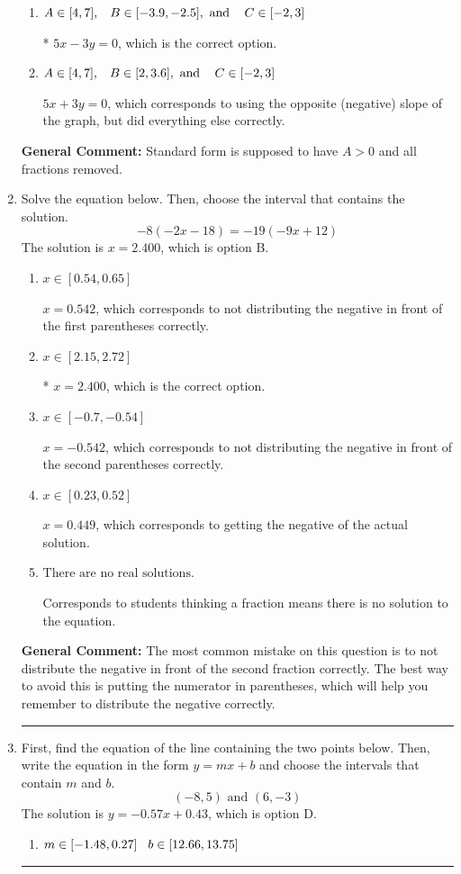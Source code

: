 \documentclass{extbook}[14pt]
\newcommand{\litem}[1]{\item #1

\rule{\textwidth}{0.4pt}}
\begin{document}
\begin{enumerate}
{\begin{enumerate}[label=\Alph*.]
 $-1.667x + 1y = -0.0$, which corresponds to not removing rational values for Standard Form.
\item \( A \in [4, 7], \hspace{3mm} B \in [-3.9, -2.5], \text{ and } \hspace{3mm} C \in [-2, 3] \)

* $5x - 3y = 0$, which is the correct option.
\item \( A \in [4, 7], \hspace{3mm} B \in [2, 3.6], \text{ and } \hspace{3mm} C \in [-2, 3] \)

 $5x + 3y = 0$, which corresponds to using the opposite (negative) slope of the graph, but did everything else correctly.
\end{enumerate}

\textbf{General Comment:} Standard form is supposed to have $A > 0$ and all fractions removed.
}
\litem{
Solve the equation below. Then, choose the interval that contains the solution.
\[ -8(-2x -18) = -19(-9x + 12) \]The solution is \( x = 2.400 \), which is option B.\begin{enumerate}[label=\Alph*.]
\item \( x \in [0.54, 0.65] \)

$x = 0.542$, which corresponds to not distributing the negative in front of the first parentheses correctly.
\item \( x \in [2.15, 2.72] \)

* $x = 2.400$, which is the correct option.
\item \( x \in [-0.7, -0.54] \)

$x = -0.542$, which corresponds to not distributing the negative in front of the second parentheses correctly.
\item \( x \in [0.23, 0.52] \)

$x = 0.449$, which corresponds to getting the negative of the actual solution.
\item \( \text{There are no real solutions.} \)

Corresponds to students thinking a fraction means there is no solution to the equation.
\end{enumerate}

\textbf{General Comment:} The most common mistake on this question is to not distribute the negative in front of the second fraction correctly. The best way to avoid this is putting the numerator in parentheses, which will help you remember to distribute the negative correctly.
}
\litem{
First, find the equation of the line containing the two points below. Then, write the equation in the form $ y=mx+b $ and choose the intervals that contain $m$ and $b$.
\[ (-8, 5) \text{ and } (6, -3) \]The solution is \( y = -0.57x + 0.43 \), which is option D.\begin{enumerate}[label=\Alph*.]
\item \( m \in [-1.48, 0.27] \hspace*{3mm} b \in [12.66, 13.75] \)


\end{enumerate}}
\end{enumerate}
\end{document}
